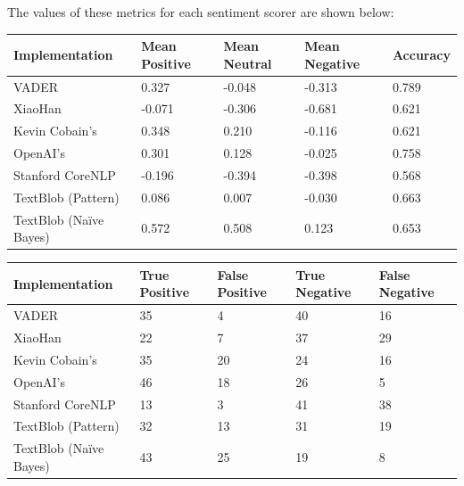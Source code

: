 \documentclass{report}
\begin{document}
The values of these metrics for each sentiment scorer are shown below: 

\vspace{0.5em}
\noindent
\begin{tabu} to 1.0\textwidth { | X[c] | X[c] | X[c] | X[c] | X[c] | }
	\hline
	Implementation & Mean Positive & Mean Neutral & Mean Negative & Accuracy \\
	\hline
	VADER \cite{VADER} & 0.327 & -0.048 & -0.313 & 0.789 \\
	\hline
	XiaoHan \cite{kalchbrennerACL2014} & -0.071 & -0.306 & -0.681 & 0.621 \\
	\hline
	Kevin Cobain's \cite{kevincobain} & 0.348 & 0.210 & -0.116 & 0.621 \\
	\hline
	OpenAI's \cite{OpenAI} & 0.301 & 0.128 & -0.025 & 0.758 \\
	\hline
	Stanford CoreNLP \cite{StanfordNLP} & -0.196 & -0.394 & -0.398 & 0.568 \\
	\hline
	TextBlob \cite{textblob} (Pattern) & 0.086 & 0.007 & -0.030 & 0.663 \\
	\hline
	TextBlob \cite{textblob} (Na\"{i}ve Bayes) & 0.572 & 0.508 & 0.123 & 0.653 \\
	\hline
\end{tabu}

\vspace{0.5em}
\noindent
\begin{tabu} to 1.0\textwidth { | X[c] | X[c] | X[c] | X[c] | X[c] |}
	\hline
	Implementation & True Positive & False Positive & True Negative & False Negative \\
	\hline
	VADER \cite{VADER} & 35 & 4 & 40 & 16 \\
	\hline
	XiaoHan \cite{kalchbrennerACL2014} & 22 & 7 & 37 & 29 \\
	\hline
	Kevin Cobain's \cite{kevincobain} & 35 & 20 & 24 & 16 \\
	\hline
	OpenAI's \cite{OpenAI} & 46 & 18 & 26 & 5 \\
	\hline
	Stanford CoreNLP \cite{StanfordNLP} & 13 & 3 & 41 & 38 \\
	\hline
	TextBlob \cite{textblob} (Pattern) & 32 & 13 & 31 & 19 \\
	\hline
	TextBlob \cite{textblob} (Na\"{i}ve Bayes) & 43 & 25 & 19 & 8 \\
	\hline
\end{tabu}
\vspace{0.5em}
	
\end{document}

